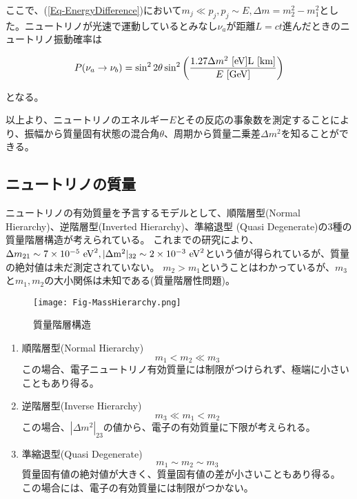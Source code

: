 \documentclass[a4paper,10pt]{jreport}
\begin{document}
ここで、(\ref{Eq-EnergyDifference})において$m_j\ll p_j,p_j\sim E,\Delta m=m_2^2-m_1^2$とした。ニュートリノが光速で運動しているとみなし$\nu_a$が距離$L=ct$進んだときのニュートリノ振動確率は

\begin{equation} \label{P_NeutrinoOscillation_c}
P(\nu_a\to\nu_b) = \sin^22\theta\sin^2\left(\frac{1.27\Delta m^2\ [\rm{eV}] L\ [\rm{km}]}{E\ [\rm{GeV}]}\right)
\end{equation}

となる\cite{Syuron_2010}。

以上より、ニュートリノのエネルギー$E$とその反応の事象数を測定することにより、振幅から質量固有状態の混合角$\theta$、周期から質量二乗差$\Delta m^2$を知ることができる。




\subsection{ニュートリノの質量}

ニュートリノの有効質量を予言するモデルとして、順階層型(Normal Hierarchy)、逆階層型(Inverted Hierarchy)、準縮退型 (Quasi Degenerate)の3種の質量階層構造が考えられている。
これまでの研究により、$\Delta m_{21}\sim 7\times10^{-5}\ \rm{eV}^2,|\Delta m^2|_{32}\sim 2\times10^{-3}\ \rm{eV}^2$という値が得られているが、質量の絶対値は未だ測定されていない。
$m_2>m_1$ということはわかっているが、$m_3$と$m_1,m_2$の大小関係は未知である(質量階層性問題)。

\begin{figure}[H]
	\center
	\texttt{[image: Fig-MassHierarchy.png]}
	\caption{質量階層構造} \label{Fig-MassHierarchy.png}
\end{figure}

\begin{enumerate}
	\item 順階層型(Normal Hierarchy) \\
	\begin{equation}
		m_1 < m_2 \ll m_3
	\end{equation}
	この場合、電子ニュートリノ有効質量には制限がつけられず、極端に小さいこともあり得る。
	
	\item 逆階層型(Inverse Hierarchy) \\
	\begin{equation}
		m_3 \ll m_1 < m_2
	\end{equation}
	この場合、$|\Delta m^2|_{23}$の値から、電子の有効質量に下限が考えられる。
	
	\item 準縮退型(Quasi Degenerate) \\
	\begin{equation}
		m_1 \sim m_2 \sim m_3
	\end{equation}
	質量固有値の絶対値が大きく、質量固有値の差が小さいこともあり得る。
	この場合には、電子の有効質量には制限がつかない。
	
\end{enumerate}
\end{document}
